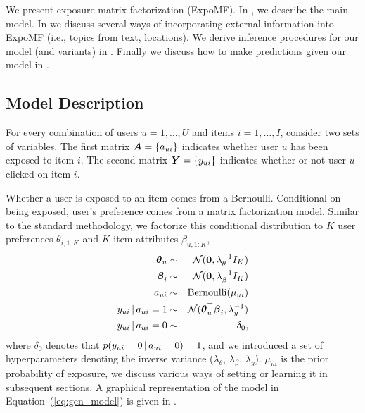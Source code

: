 We present exposure matrix factorization (ExpoMF). 
In , we describe the main model. 
In  we discuss several ways 
of incorporating external information into ExpoMF (i.e., topics from text, locations). 
We derive inference procedures for our model (and variants) in . Finally we discuss how to make predictions given our model in .

\subsection{Model Description}
\label{sec:model_description}

For every combination of users $u=1,\dots,U$ and items $i=1,\dots,I$, consider two sets of variables. The first matrix $\boldsymbol{A} = \left\{ a_{ui} \right\}$ indicates whether user $u$ has been exposed to item $i$. The second matrix $\boldsymbol{Y} = \left\{ y_{ui} \right\}$ indicates whether or not user $u$ clicked on item $i$.

Whether a user is exposed to an item comes from a Bernoulli. Conditional on being exposed, user's preference comes from a matrix factorization model. Similar to the standard methodology, we factorize this conditional distribution to $K$ user preferences $\theta_{i,1:K}$ and $K$ item attributes $\beta_{u,1:K}$,
\begin{eqnarray} %
	\boldsymbol\theta_{u} &\sim& \mathcal{N}(\bzero, \lambda_\theta^{-1} I_K) \nonumber \\
	\boldsymbol\beta_{i} &\sim& \mathcal{N}(\bzero, \lambda_\beta^{-1} I_K)  \nonumber \\
	a_{ui} &\sim& \mathrm{Bernoulli}(\mu_{ui}) \nonumber \\
	y_{ui} \g a_{ui} = 1 &\sim& \mathcal{N}(\boldsymbol\theta_u^\top \boldsymbol\beta_i, \lambda_y^{-1}) \nonumber \\
	y_{ui} \g a_{ui} = 0 &\sim& \delta_0,
	\label{eq:gen_model}
 \end{eqnarray}
where $\delta_0$ denotes that $p(y_{ui} = 0 \,\vert\, a_{ui} = 0) = 1$, and we
introduced a set of hyperparameters denoting the inverse variance
($\lambda_\theta$, $\lambda_\beta$, $\lambda_y$). $\mu_{ui}$ is the prior
probability of exposure, we discuss various ways of setting or learning it
in subsequent sections. 
A graphical representation of the model in Equation~(\ref{eq:gen_model}) is given in . 

